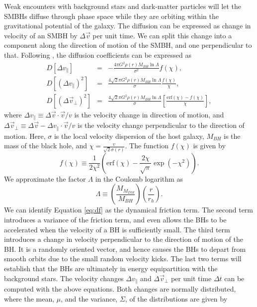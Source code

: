 \documentclass[fleqn,usenatbib,useAMS]{mnras}
\begin{document}
Weak encounters with background stars and dark-matter particles will let the SMBHs diffuse through phase space while they are orbiting within the gravitational potential of the galaxy. The diffusion can be expressed as change in velocity of an SMBH by $\Delta \vec{v}$ per unit time. We can split this change into a component along the direction of motion of the SMBH, and one perpendicular to that. Following \citet{2008gady.book.....B}, the diffusion coefficients can be expressed as 
\begin{eqnarray}\label{eq:df}
D[\Delta v_\parallel] & = & -\frac{4\pi G^2\rho(r)M_{BH}\ln\Lambda}{\sigma^2}f(\chi),\\
D[(\Delta v_\parallel)^2] & = & \frac{4\sqrt{2}\pi G^2\rho(r)M_{BH}\ln\Lambda}{\sigma}\frac{f(\chi)}{\chi},\\
D[(\Delta \vec{v}_\bot)^2] & = & \frac{4\sqrt{2}\pi G^2\rho(r)M_{BH}\ln\Lambda}{\sigma}\left[\frac{\mbox{erf}(\chi)-f(\chi)}{\chi}\right],
\end{eqnarray} 
where $\Delta v_\parallel \equiv \Delta \vec{v}\cdot\vec{v}/v$ is the velocity change in direction of motion, and $\Delta \vec{v}_\bot \equiv \Delta \vec{v} - \Delta v_\parallel \cdot\vec{v}/v$ is the velocity change perpendicular to the direction of motion. Here, $\sigma$ is the local velocity dispersion of the host galaxy, $M_{BH}$ is the mass of the black hole, and $\chi = \frac{v}{\sqrt{2}\sigma(r)}$. The function $f(\chi)$ is given by 
\begin{equation}
f(\chi) \equiv \frac{1}{2\chi^2}\left(\mbox{erf}(\chi)-\frac{2\chi}{\sqrt{\pi}}\exp\left(-\chi^2\right)\right).
\end{equation}
We approximate the factor $\Lambda$ in the Coulomb logarithm as
\begin{equation}
\Lambda \equiv \left(\frac{M_{M_{DM}}}{M_{BH}}\right)\left(\frac{r}{r_h}\right).
\end{equation}
We can identify Equation \ref{eq:df} as the dynamical friction term. The second term introduces a variance of the friction term, and even allows the BHs to be accelerated when the velocity of a BH is sufficiently small. The third term introduces a change in velocity perpendicular to the direction of motion of the BH. It is a randomly oriented vector, and hence causes the BHs to depart from smooth orbits due to the small random velocity kicks. The last two terms will establish that the BHs are ultimately in energy equipartition with the background stars.
The velocity changes $\Delta v_\parallel$ and $\Delta\vec{v}_\bot$ per unit time $\Delta t$ can be computed with the above equations. Both changes are normally distributed, where the mean, $\mu$, and the variance, $\Sigma$, of the distributions are given by
\end{document}
